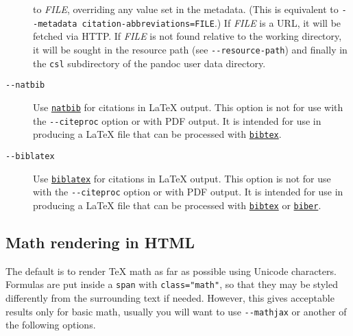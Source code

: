 \documentclass[
  a4paper,
]{article}
\begin{document}
\begin{description}
to \emph{FILE}, overriding any value set in the metadata. (This is
equivalent to \texttt{-\/-metadata\ citation-abbreviations=FILE}.) If
\emph{FILE} is a URL, it will be fetched via HTTP. If \emph{FILE} is not
found relative to the working directory, it will be sought in the
resource path (see \texttt{-\/-resource-path}) and finally in the
\texttt{csl} subdirectory of the pandoc user data directory.
\item[\texttt{-\/-natbib}]
Use \href{https://ctan.org/pkg/natbib}{\texttt{natbib}} for citations in
LaTeX output. This option is not for use with the \texttt{-\/-citeproc}
option or with PDF output. It is intended for use in producing a LaTeX
file that can be processed with
\href{https://ctan.org/pkg/bibtex}{\texttt{bibtex}}.
\item[\texttt{-\/-biblatex}]
Use \href{https://ctan.org/pkg/biblatex}{\texttt{biblatex}} for
citations in LaTeX output. This option is not for use with the
\texttt{-\/-citeproc} option or with PDF output. It is intended for use
in producing a LaTeX file that can be processed with
\href{https://ctan.org/pkg/bibtex}{\texttt{bibtex}} or
\href{https://ctan.org/pkg/biber}{\texttt{biber}}.
\end{description}

\hypertarget{math-rendering-in-html}{%
\subsection{Math rendering in HTML}\label{math-rendering-in-html}}

The default is to render TeX math as far as possible using Unicode
characters. Formulas are put inside a \texttt{span} with
\texttt{class="math"}, so that they may be styled differently from the
surrounding text if needed. However, this gives acceptable results only
for basic math, usually you will want to use \texttt{-\/-mathjax} or
another of the following options.
\end{document}
